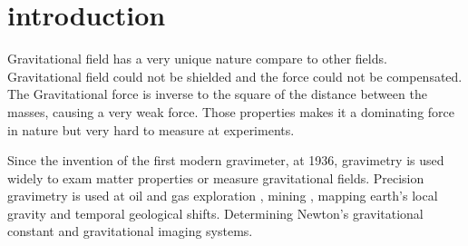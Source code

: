 \documentclass[\main/master.tex]{subfiles}
\begin{document}
\chapter{introduction}\label{chp:example-1}

Gravitational field has a very unique nature compare to other fields. Gravitational field could not be shielded and the force could not be compensated. The Gravitational force is inverse to the square of the distance between the masses, causing a very weak force. Those properties makes it a dominating force in nature but very hard to measure at experiments.
\par
Since the invention of the first modern gravimeter, at 1936, gravimetry is used widely to exam matter properties or measure gravitational fields. Precision gravimetry \cite{Wahr04,Bingham10,Bell98,Leeuwen00,Diorio03,Romaides01,Peters01,Luther82,Kuroda95,Karagioz96,Bagley97,Gundlach00,Quinn01,Armstrong03,Kleinevoss99,Parks10,Peters99,Mcguirk02,Dimopoulos07,Lamporesi08,Sorrentino10,Rosi14,Goodkind99} is used at oil and gas exploration \cite{Bell98}, mining \cite{Leeuwen00}, mapping earth's local gravity \cite{Wahr04,Bingham10} and temporal geological shifts. Determining Newton's gravitational constant \cite{Luther82, Kuroda95, Karagioz96, Bagley97, Gundlach00, Quinn01, Armstrong03, Kleinevoss99, Parks10, Peters99, Mcguirk02, Dimopoulos07, Lamporesi08, Sorrentino10, Rosi14} and gravitational imaging systems. 
\end{document}
